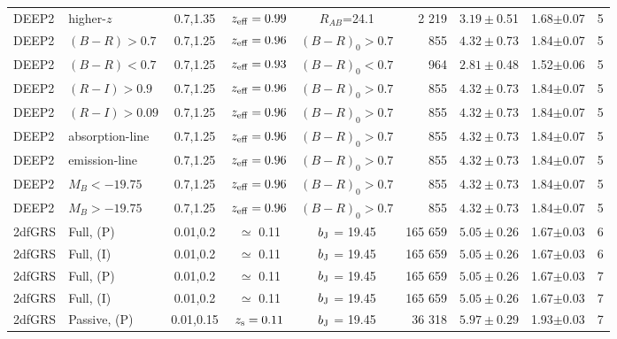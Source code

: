 \documentclass[usenatbib]{mn2e}
\begin{document}
\begin{table}
\begin{center}
\begin{tabular}{llcccrccc}
DEEP2     &higher-$z$ &0.7,1.35   & $z_{\rm eff}=0.99$ & $R_{AB}$=24.1            &    2 219 & $3.19\pm$0.51         & 1.68$\pm$0.07  &         5 \\
DEEP2     & $(B-R)>0.7$ &0.7,1.25   & $z_{\rm eff}=0.96$ & $(B-R)_0 >0.7$           &      855 & $4.32\pm$0.73         & 1.84$\pm$0.07     &    5   \\
DEEP2     & $(B-R)<0.7$ &0.7,1.25   & $z_{\rm eff}=0.93$ & $(B-R)_0 <0.7$           &      964 & $2.81\pm$0.48         & 1.52$\pm$0.06   &       5  \\
DEEP2     & $(R-I)>0.9$ &0.7,1.25   & $z_{\rm eff}=0.96$ & $(B-R)_0 >0.7$           &      855 & $4.32\pm$0.73         & 1.84$\pm$0.07     &      5 \\
DEEP2     & $(R-I)>0.09$ &0.7,1.25   & $z_{\rm eff}=0.96$ & $(B-R)_0 >0.7$           &      855 & $4.32\pm$0.73         & 1.84$\pm$0.07     &      5 \\
DEEP2     & absorption-line &0.7,1.25   & $z_{\rm eff}=0.96$ & $(B-R)_0 >0.7$           &      855 & $4.32\pm$0.73         & 1.84$\pm$0.07     &    5   \\
DEEP2     & emission-line &0.7,1.25   & $z_{\rm eff}=0.96$ & $(B-R)_0 >0.7$           &      855 & $4.32\pm$0.73         & 1.84$\pm$0.07     &       5 \\
DEEP2     & $M_{B}<-19.75$ &0.7,1.25   & $z_{\rm eff}=0.96$ & $(B-R)_0 >0.7$           &      855 & $4.32\pm$0.73         & 1.84$\pm$0.07     &      5  \\
DEEP2     & $M_{B}>-19.75$ &0.7,1.25   & $z_{\rm eff}=0.96$ & $(B-R)_0 >0.7$           &      855 & $4.32\pm$0.73         & 1.84$\pm$0.07     &      5 \\
\hline
2dfGRS    & Full, (P)    &0.01,0.2   & $\simeq$ 0.11  & $b_{\rm J}$ = 19.45            &  165 659 & $5.05\pm$0.26         & 1.67$\pm$0.03   &       6  \\
2dfGRS    & Full, (I)    &0.01,0.2   & $\simeq$ 0.11  & $b_{\rm J}$ = 19.45            &  165 659 & $5.05\pm$0.26         & 1.67$\pm$0.03   &       6  \\
\hline
2dfGRS    & Full, (P)    &0.01,0.2   & $\simeq$ 0.11  & $b_{\rm J}$ = 19.45            &  165 659 & $5.05\pm$0.26         & 1.67$\pm$0.03   &    7     \\
2dfGRS    & Full, (I)    &0.01,0.2   & $\simeq$ 0.11  & $b_{\rm J}$ = 19.45            &  165 659 & $5.05\pm$0.26         & 1.67$\pm$0.03   &     7    \\
2dfGRS    & Passive, (P) &0.01,0.15  & $z_{\rm s}= 0.11$  & $b_{\rm J}$ = 19.45            &   36 318 & $5.97\pm$0.29         & 1.93$\pm$0.03 &     7      \\

\end{tabular}
\end{center}
\end{table}
\end{document}
